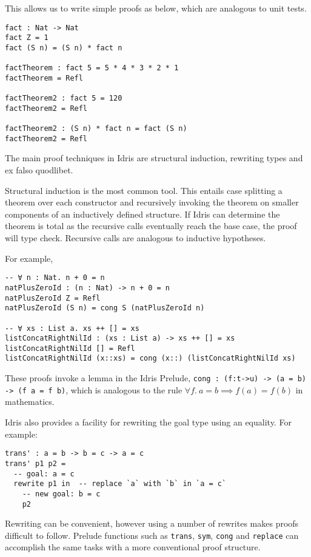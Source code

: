 \documentclass[11pt]{report}
\begin{document}
\begin{spacing}{1.15}
This allows us to write simple proofs as below, which are analogous to unit tests.

\begin{verbatim}
fact : Nat -> Nat
fact Z = 1
fact (S n) = (S n) * fact n

factTheorem : fact 5 = 5 * 4 * 3 * 2 * 1
factTheorem = Refl

factTheorem2 : fact 5 = 120
factTheorem2 = Refl

factTheorem2 : (S n) * fact n = fact (S n)
factTheorem2 = Refl
\end{verbatim}

The main proof techniques in Idris are structural induction, rewriting types and ex falso quodlibet.

Structural induction is the most common tool. This entails case splitting a theorem over each constructor and recursively invoking the theorem on smaller components of an inductively defined structure. If Idris can determine the theorem is total as the recursive calls eventually reach the base case, the proof will type check. Recursive calls are analogous to inductive hypotheses.

For example,

\begin{verbatim}
-- ∀ n : Nat. n + 0 = n
natPlusZeroId : (n : Nat) -> n + 0 = n
natPlusZeroId Z = Refl
natPlusZeroId (S n) = cong S (natPlusZeroId n)

-- ∀ xs : List a. xs ++ [] = xs
listConcatRightNilId : (xs : List a) -> xs ++ [] = xs
listConcatRightNilId [] = Refl
listConcatRightNilId (x::xs) = cong (x::) (listConcatRightNilId xs)
\end{verbatim}

These proofs invoke a lemma in the Idris Prelude, \texttt{cong :\ (f:t->u) -> (a = b) -> (f a = f b)}, which is analogous to the rule $\forall f.~a=b\!\!\implies\!\! f(a)=f(b)$ in mathematics.

Idris also provides a facility for rewriting the goal type using an equality. For example:

\begin{verbatim}
trans' : a = b -> b = c -> a = c
trans' p1 p2 =
  -- goal: a = c
  rewrite p1 in  -- replace `a` with `b` in `a = c`
    -- new goal: b = c
    p2
\end{verbatim}

Rewriting can be convenient, however using a number of rewrites makes proofs difficult to follow. Prelude functions such as \texttt{trans}, \texttt{sym}, \texttt{cong} and \texttt{replace} can accomplish the same tasks with a more conventional proof structure.


\end{spacing}
\end{document}
